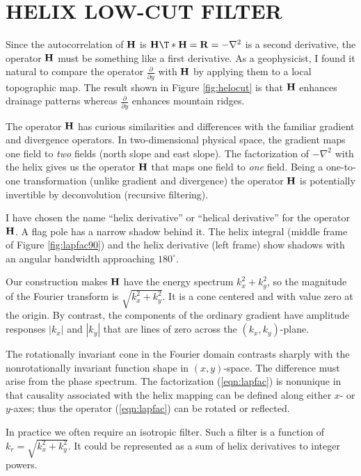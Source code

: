 \section{HELIX LOW-CUT FILTER}
Since the autocorrelation of $\bold H$ is
$\bold H\T \ast \bold H = \bold R =-\nabla^2$
is a second derivative,
the operator $\bold H$ must be something like a first derivative.
As a geophysicist, I found it natural to compare
the operator $\frac{\partial}{\partial y}$
with $\bold H$ by applying them to a local topographic map.
The result shown in
Figure \ref{fig:helocut}
is that $\bold H$ enhances drainage patterns whereas
$\frac{\partial}{\partial y}$ enhances mountain ridges.
\par
The operator $\bold H$ has
curious similarities and differences
with the familiar gradient and divergence operators.
In two-dimensional physical space,
the gradient maps one field to {\em two} fields
(north slope and east slope).
The factorization of $-\nabla^2$ with the helix
gives us the operator $\bold H$
that maps one field to {\em  one} field.
Being a one-to-one transformation
(unlike gradient and divergence)
the operator $\bold H$ is potentially invertible
by deconvolution (recursive filtering).
\par
I have chosen the name
``helix derivative''
or ``helical derivative'' for the operator $\bold H$.
A flag pole has a narrow shadow behind it.
The helix integral (middle frame of Figure \ref{fig:lapfac90})
and the helix derivative (left frame)
show shadows with an angular bandwidth approaching $180^\circ$.
\par
Our construction makes $\bold H$ have the energy spectrum $k_x^2+k_y^2$,
so the magnitude of the Fourier transform is $\sqrt{k_x^2+k_y^2}$.
It is a cone
centered and with value zero at the origin.
By contrast, the components of the ordinary gradient
have amplitude responses $|k_x|$ and $|k_y|$
that are lines of zero across the
$(k_x,k_y)$-plane.
\par
The rotationally invariant cone in the Fourier domain
contrasts sharply with the nonrotationally invariant
function shape in $(x,y)$-space.
The difference must arise from the phase spectrum.
The factorization (\ref{eqn:lapfac})
is nonunique in that causality
associated with the helix mapping
can be defined along either $x$- or $y$-axes;
thus the operator 
(\ref{eqn:lapfac})
can be rotated or reflected.
\par
In practice we often require an isotropic filter.
Such a filter is a function of $k_r=\sqrt{k_x^2 + k_y^2}$.
It could be represented as a sum of helix derivatives to integer powers.

